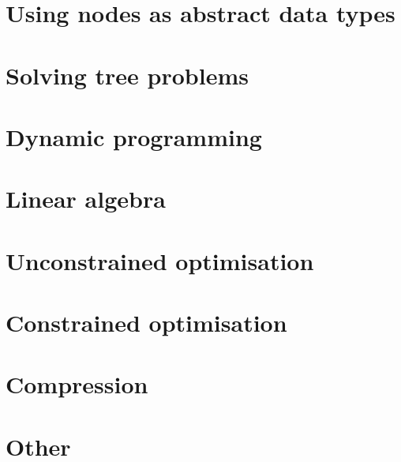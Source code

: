 \documentclass[oneside]{book}
\begin{document}
\part{Using nodes as abstract data types}





\part{Solving tree problems}







\part{Dynamic programming}




\part{Linear algebra}









\part{Unconstrained optimisation}





\part{Constrained optimisation}


\part{Compression}


\part{Other}


\end{document}
